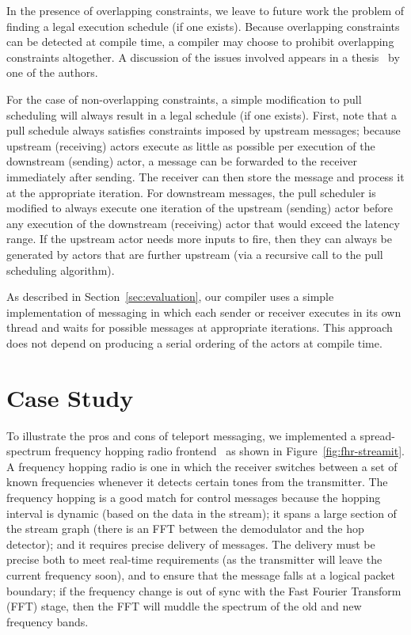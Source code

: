 

In the presence of overlapping constraints, we leave to future work
the problem of finding a legal execution schedule (if one exists).
Because overlapping constraints can be detected at compile time, a
compiler may choose to prohibit overlapping constraints altogether.  A
discussion of the issues involved appears in a
thesis~\cite{karczma-thesis} by one of the authors.

For the case of non-overlapping constraints, a simple modification to
pull scheduling will always result in a legal schedule (if one
exists).  First, note that a pull schedule always satisfies
constraints imposed by upstream messages; because upstream (receiving)
actors execute as little as possible per execution of the downstream
(sending) actor, a message can be forwarded to the receiver
immediately after sending.  The receiver can then store the message
and process it at the appropriate iteration.  For downstream messages,
the pull scheduler is modified to always execute one iteration of the
upstream (sending) actor before any execution of the downstream
(receiving) actor that would exceed the latency range.  If the
upstream actor needs more inputs to fire, then they can always be
generated by actors that are further upstream (via a recursive call to
the pull scheduling algorithm).

As described in Section~\ref{sec:evaluation}, our compiler uses a
simple implementation of messaging in which each sender or receiver
executes in its own thread and waits for possible messages at
appropriate iterations.  This approach does not depend on producing a
serial ordering of the actors at compile time.

%

\section{Case Study}
\label{sec:casestudy}

To illustrate the pros and cons of teleport messaging, we implemented
a spread-spectrum frequency hopping radio frontend~\cite{harada02} as
shown in Figure~\ref{fig:fhr-streamit}.  A frequency hopping radio is
one in which the receiver switches between a set of known frequencies
whenever it detects certain tones from the transmitter.  The
frequency hopping is a good match for control messages because the
hopping interval is dynamic (based on the data in the stream); it
spans a large section of the stream graph (there is an FFT between the
demodulator and the hop detector); and it requires precise delivery of
messages.  The delivery must be precise both to meet real-time
requirements (as the transmitter will leave the current frequency
soon), and to ensure that the message falls at a logical packet
boundary; if the frequency change is out of sync with the Fast Fourier
Transform (FFT) stage, then the FFT will muddle the spectrum of the
old and new frequency bands.

